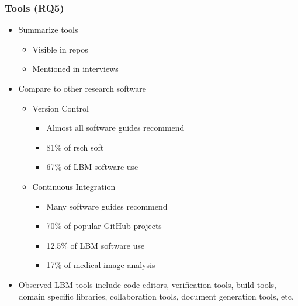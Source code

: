 \documentclass[usenames,dvipsnames]{beamer}
\begin{document}
\hoffset=0in %


\begin{frame}

\frametitle{Tools (RQ5)}

\begin{itemize}
  \item Summarize tools
  \begin{itemize}
    \item Visible in repos
    \item Mentioned in interviews
  \end{itemize}
  \item Compare to other research software
  \begin{itemize}
    \item Version Control
    \begin{itemize}
      \item Almost all software guides recommend
      \item 81\% of rsch soft \citep{AlNoamanyAndBorghi2018}
      \item 67\% of LBM software use
    \end{itemize}
    \item Continuous Integration
    \begin{itemize}
      \item Many software guides recommend
      \item 70\% of popular GitHub projects \citep{HiltonEtAl2016}
      \item 12.5\% of LBM software use
      \item 17\% of medical image analysis \citep{Dong2021}
    \end{itemize}
  \end{itemize}
  \item Observed LBM tools include code editors, verification tools, build
  tools, domain specific libraries, collaboration tools, document generation
  tools, etc.
\end{itemize}

\end{frame}
  
\end{document}
